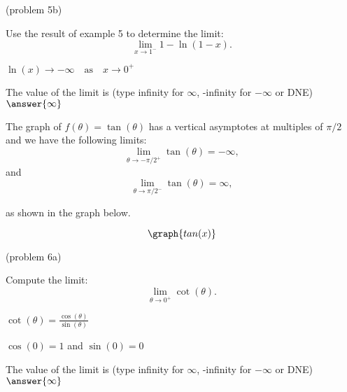 \documentclass[handout]{ximera}
\begin{document}
\begin{problem}(problem 5b)
  
	Use the result of example 5 to determine the limit:
  \[
  \lim_{x \to {1^-}} 1 - \ln(1-x).
  \]
		\begin{hint}
		  $\ln(x) \to -\infty \quad \text{as} \quad x \to 0^+$
		\end{hint}	
		The value of the limit is
		(type infinity for $\infty$, -infinity for $-\infty$ or DNE)
		 $\answer{\infty}$
		
\end{problem}

\begin{example}[example 6]
The graph of $f(\theta) = \tan(\theta)$ has a vertical asymptotes at multiples of $\pi/2$ and
we have the following limits: 
\[
\lim_{\theta\to -\pi/2^+} \tan(\theta) = -\infty,
\]
and
\[
\lim_{\theta\to \pi/2^-} \tan(\theta) = \infty,
\]

as shown in the graph below.
		
			
\[
\graph{tan(x)}
\]
\end{example}

\begin{problem}(problem 6a)
  
	Compute the limit:
  \[
  \lim_{\theta \to {0^+}} \cot(\theta).
  \]
		\begin{hint}
		  $\cot(\theta) = \frac{\cos(\theta)}{\sin(\theta)}$
		\end{hint}	
		\begin{hint}
		  $\cos(0) = 1$ and $\sin(0) = 0$
		\end{hint}
		
		The value of the limit is
		(type infinity for $\infty$, -infinity for $-\infty$ or DNE)
		 $\answer{\infty}$
		
\end{problem}
\end{document}
